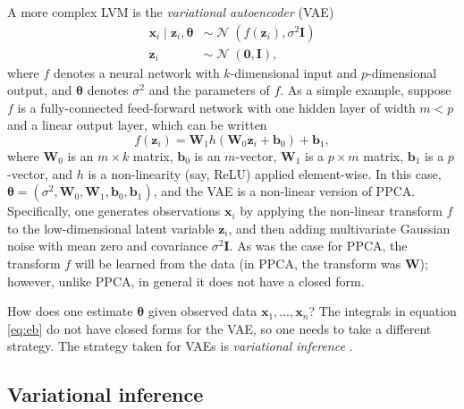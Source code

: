 \documentclass[reqno,11pt]{amsart}
\DeclareMathOperator\N{\mathcal{N}}
\newcommand\mi{\mathbf{I}}
\newcommand\mw{\mathbf{W}}
\newcommand\vb{\mathbf{b}}
\newcommand\vtheta{\boldsymbol{\theta}}
\newcommand\vx{\mathbf{x}}
\newcommand\vz{\mathbf{z}}
\begin{document}
A more complex LVM is the \emph{variational autoencoder} (VAE)
\cite{DBLP:journals/corr/KingmaW13}
%
\begin{align}
  \vx_i \mid \vz_i, \vtheta &\sim \N(f(\vz_i), \sigma^2 \mi)\\
  \vz_i &\sim \N(\boldsymbol{0}, \mi),
\end{align}
%
where $f$ denotes a neural network with $k$-dimensional input and
$p$-dimensional output, and $\vtheta$ denotes $\sigma^2$ and the parameters of
$f$. As a simple example, suppose $f$ is a fully-connected feed-forward network
with one hidden layer of width $m < p$ and a linear output layer, which can be
written
%
\begin{equation}
  f(\vz_i) = \mw_1 h(\mw_0 \vz_i + \vb_0) + \vb_1,
\end{equation}
%
where $\mw_0$ is an $m \times k$ matrix, $\vb_0$ is an $m$-vector, $\mw_1$ is a
$p \times m$ matrix, $\vb_1$ is a $p$-vector, and $h$ is a non-linearity (say,
ReLU) applied element-wise. In this case, $\vtheta = (\sigma^2, \mw_0, \mw_1,
\vb_0, \vb_1)$, and the VAE is a non-linear version of PPCA. Specifically, one
generates observations $\vx_i$ by applying the non-linear transform $f$ to the
low-dimensional latent variable $\vz_i$, and then adding multivariate Gaussian
noise with mean zero and covariance $\sigma^2 \mi$. As was the case for PPCA,
the transform $f$ will be learned from the data (in PPCA, the transform was
$\mw$); however, unlike PPCA, in general it does not have a closed form.

How does one estimate $\vtheta$ given observed data $\vx_1, \ldots, \vx_n$? The
integrals in equation \eqref{eq:eb} do not have closed forms for the VAE, so
one needs to take a different strategy. The strategy taken for VAEs is
\emph{variational inference} \cite{10.1080/01621459.2017.1285773}.

\subsection{Variational inference}
\end{document}
